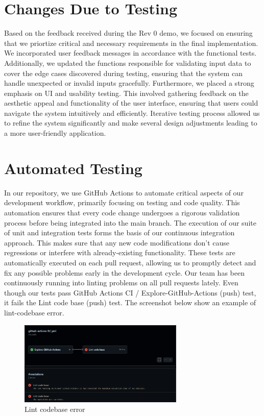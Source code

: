 \documentclass[12pt, titlepage]{article}
\begin{document}
\section{Changes Due to Testing}

Based on the feedback received during the Rev 0 demo, we focused on ensuring that we priortize critical and necessary requirements in the final implementation. We incorporated user feedback messages in accordance with the functional tests. Additionally, we updated the functions responsible for validating input data to cover the edge cases discovered during testing, ensuring that the system can handle unexpected or invalid inputs gracefully. Furthermore, we placed a strong emphasis on UI and usability testing. This involved gathering feedback on the aesthetic appeal and functionality of the user interface, ensuring that users could navigate the system intuitively and efficiently. Iterative testing process allowed us to refine the system significantly and make several design adjustments leading to a more user-friendly application.

\section{Automated Testing}

In our repository, we use GitHub Actions to automate critical aspects of our development workflow, primarily focusing on testing and code quality. This automation ensures that every code change undergoes a rigorous validation process before being integrated into the main branch. The execution of our suite of unit and integration tests forms the basis of our continuous integration approach. This makes sure that any new code modifications don't cause regressions or interfere with already-existing functionality. These tests are automatically executed on each pull request, allowing us to promptly detect and fix any possible problems early in the development cycle. Our team has been continuously running into linting problems on all pull requests lately. Even though our tests pass GitHub Actions CI / Explore-GitHub-Actions (push) test, it fails the Lint code base (push) test. The screenshot below show an example of lint-codebase error.

\begin{figure}[h]
  \centering
  \includegraphics[width=0.7\textwidth]{lintCodebaseError.png}
  \caption{Lint codebase error}
  \label{FigUH}
\end{figure}
\end{document}
